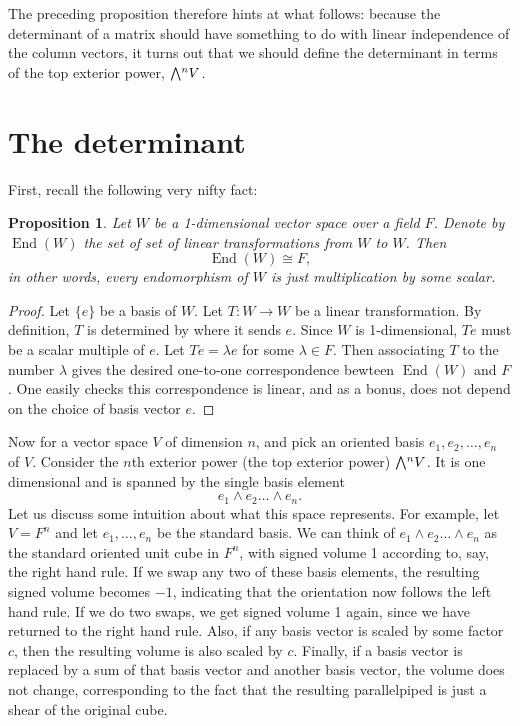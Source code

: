\documentclass[11pt,oneside]{amsart}
\theoremstyle{definition}
\theoremstyle{plain}
\newtheorem{proposition}{Proposition}
\newcommand{\extp}{\mathchoice{{\textstyle\bigwedge}}%
    {{\bigwedge}}%
    {{\textstyle\wedge}}%
    {{\scriptstyle\wedge}}}
\DeclareMathOperator{\End}{End}
\begin{document}
The preceding proposition therefore hints at what follows: because the determinant of a matrix should have something to do with linear independence of the column vectors, it turns out that we should define the determinant in terms of the top exterior power, $\extp^n V$.

\section{The determinant}
First, recall the following very nifty fact:
\begin{proposition}\label{prop:end}
    Let $W$ be a 1-dimensional vector space over a field $F$. Denote by $\End(W)$ the set of set of linear transformations from $W$ to $W$. Then
    \[\End(W)\cong F,\]
    in other words, every endomorphism of $W$ is just multiplication by some scalar.
\end{proposition}
\begin{proof}
    Let $\{e\}$ be a basis of $W$. Let $T\colon W\to W$ be a linear transformation. By definition, $T$ is determined by where it sends $e$. Since $W$ is 1-dimensional, $Te$ must be a scalar multiple of $e$. Let $Te=\lambda e$ for some $\lambda\in F$. Then associating $T$ to the number $\lambda$ gives the desired one-to-one correspondence bewteen $\End(W)$ and $F$. One easily checks this correspondence is linear, and as a bonus, does not depend on the choice of basis vector $e$.
\end{proof}

Now for a vector space $V$ of dimension $n$, and pick an oriented basis $e_1,e_2,\dots,e_n$ of $V$. Consider the $n$th exterior power (the top exterior power) $\extp^n V$. It is one dimensional and is spanned by the single basis element
\[e_1\wedge e_2\dots\wedge e_n.\]
Let us discuss some intuition about what this space represents. For example, let $V=F^n$ and let $e_1,\dots,e_n$ be the standard basis. We can think of $e_1\wedge e_2\dots\wedge e_n$ as the standard oriented unit cube in $F^n$, with signed volume 1 according to, say, the right hand rule. If we swap any two of these basis elements, the resulting signed volume becomes $-1$, indicating that the orientation now follows the left hand rule. If we do two swaps, we get signed volume 1 again, since we have returned to the right hand rule. Also, if any basis vector is scaled by some factor $c$, then the resulting volume is also scaled by $c$. Finally, if a basis vector is replaced by a sum of that basis vector and another basis vector, the volume does not change, corresponding to the fact that the resulting parallelpiped is just a shear of the original cube.
\end{document}

